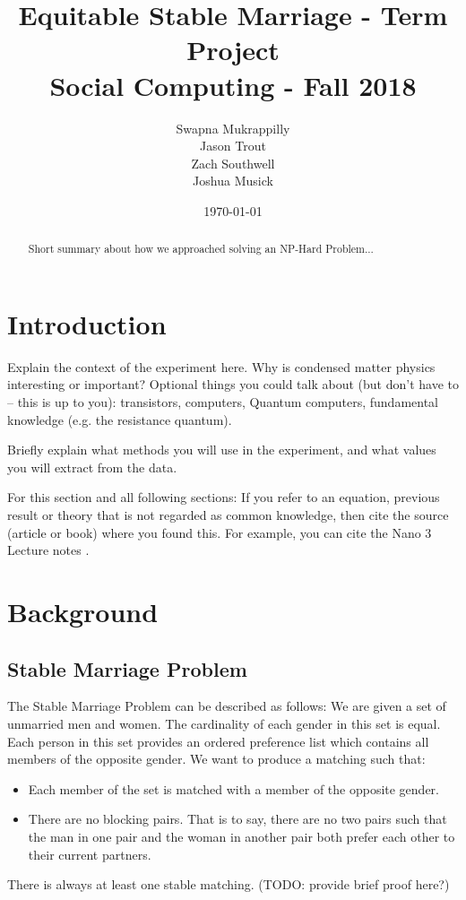 \documentclass[a4paper]{article}
\title{Equitable Stable Marriage - Term Project\\Social Computing - Fall 2018}
\author{Swapna Mukrappilly\\Jason Trout\\Zach Southwell\\Joshua Musick}
\date{\today}
\begin{document}
\maketitle

\begin{abstract}
Short summary about how we approached solving an NP-Hard Problem...
\end{abstract}

\section{Introduction}
\label{sec:introduction}

Explain the context of the experiment here. Why is condensed matter physics interesting or important?
Optional things you could talk about (but don't have to -- this is up to you): transistors, computers, Quantum computers, fundamental knowledge (e.g. the resistance quantum).

Briefly explain what methods you will use in the experiment, and what values you will extract from the data.

For this section and all following sections: If you refer to an equation, previous result or theory that is not regarded as common knowledge, then cite the source (article or book) where you found this. For example, you can cite the Nano 3 Lecture notes \cite{nano3}.


\section{Background}
\label{sec:background}

\subsection{Stable Marriage Problem}
The Stable Marriage Problem can be described as follows: We are given a set of unmarried men and women. The cardinality of each gender in this set is equal. Each person in this set provides an ordered preference list which contains all members of the opposite gender. We want to produce a matching such that:
\begin{itemize}
    \item Each member of the set is matched with a member of the opposite gender.
    \item There are no blocking pairs. That is to say, there are no two pairs such that the man in one pair and the woman in another pair both prefer each other to their current partners.
\end{itemize}
There is always at least one stable matching. (TODO: provide brief proof here?)
\end{document}
